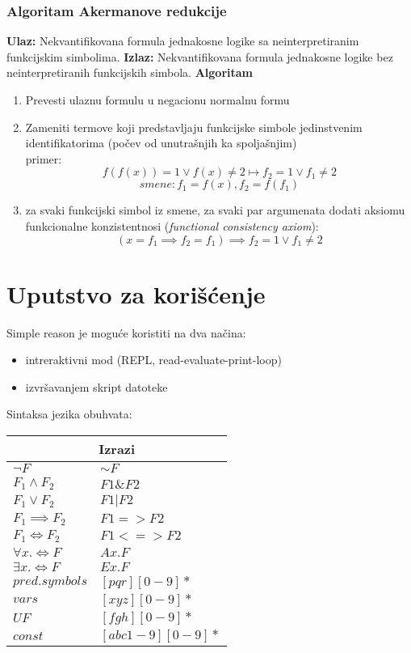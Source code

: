 \documentclass[a4paper]{article}
\begin{document}
\subsubsection*{Algoritam Akermanove redukcije}
\textbf{Ulaz:} Nekvantifikovana formula jednakosne logike sa neinterpretiranim funkcijskim simbolima.
\textbf{Izlaz:} Nekvantifikovana formula jednakosne logike bez neinterpretiranih funkcijskih simbola.
\textbf{Algoritam}
\begin{enumerate}
	\item Prevesti ulaznu formulu u negacionu normalnu formu
	\item Zameniti termove koji predstavljaju funkcijske simbole jedinstvenim identifikatorima (počev od unutrašnjih ka spoljašnjim)\\
	primer:\\
	$$f(f(x)) = 1 \lor f(x) \neq 2 \mapsto f_2 = 1 \lor f_1 \neq 2$$
	$$smene: f_1 = f(x), f_2 = f(f_1)$$
	\item za svaki funkcijski simbol iz smene, za svaki par argumenata dodati aksiomu funkcionalne konzistentnosi (\textit{functional consistency axiom}):
	$$(x = f_1 \implies f_2 = f_1) \implies f_2 = 1 \lor f_1 \neq 2$$
\end{enumerate}

\section{Uputstvo za korišćenje}
\label{sec:uputstvo}
Simple reason je moguće koristiti na dva načina:
\begin{itemize}
	\item intreraktivni mod (REPL, read-evaluate-print-loop)
	\item izvršavanjem skript datoteke
\end{itemize}
Sintaksa jezika obuhvata:\\
\begin{tabular}{ |l|l| }
	\hline
	\multicolumn{2}{|c|}{Izrazi} \\
	\hline
	$\lnot F$ & $\sim F$ \\
	$F_1 \land F_2$ & $F1 \& F2$ \\
	$F_1 \lor F_2$ & $F1 | F2$ \\
	$F_1 \implies F_2$ & $F1 => F2$ \\
	$F_1 \Leftrightarrow F_2$ & $F1 <=> F2$ \\
	$\forall x. \Leftrightarrow F$ & $Ax. F$ \\
	$\exists x. \Leftrightarrow F$ & $Ex. F$ \\
	$pred. symbols$ & $[pqr][0-9]*$ \\
	$vars$ & $[xyz][0-9]*$ \\
	$UF$ & $[fgh][0-9]*$ \\
	$const$ & $[abc1-9][0-9]*$ \\
	\hline
\end{tabular}
\end{document}
